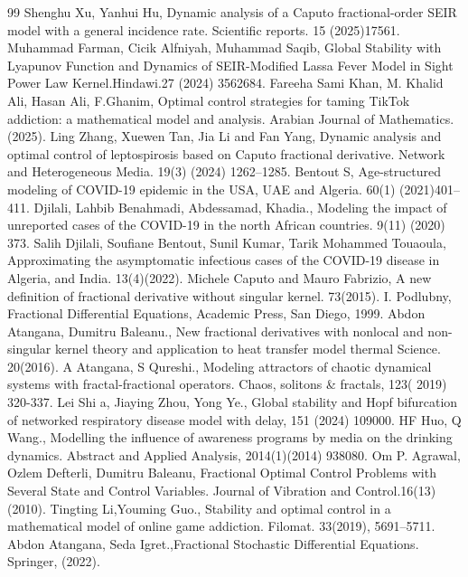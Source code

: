 \documentclass[10pt]{article}
\begin{document}
\begin{thebibliography}{99}
		 Shenghu Xu, Yanhui Hu, Dynamic analysis of a Caputo fractional-order SEIR model with a general incidence rate. Scientific reports. 15 (2025)17561.
		 Muhammad Farman, Cicik Alfniyah, Muhammad Saqib, Global Stability with Lyapunov Function and Dynamics of SEIR-Modified Lassa Fever Model in Sight Power Law Kernel.Hindawi.27 (2024) 3562684.
		 Fareeha Sami Khan, M. Khalid Ali, Hasan Ali, F.Ghanim, Optimal control strategies for taming TikTok addiction: a mathematical model and analysis. Arabian Journal of Mathematics. (2025).
		 Ling Zhang, Xuewen Tan, Jia Li and Fan Yang, Dynamic analysis and optimal control of leptospirosis based on Caputo fractional derivative. Network and Heterogeneous Media. 19(3) (2024) 1262–1285.
		 Bentout S, Age-structured modeling of COVID-19 epidemic in the USA, UAE and Algeria. 60(1) (2021)401–411.
		 Djilali, Lahbib Benahmadi, Abdessamad, Khadia., Modeling the impact of unreported cases of the COVID-19 in the north African countries. 9(11) (2020) 373.
		 Salih Djilali, Soufiane Bentout, Sunil Kumar, Tarik Mohammed Touaoula, Approximating the asymptomatic infectious cases of the COVID-19 disease in Algeria, and India. 13(4)(2022).
		 Michele Caputo and Mauro Fabrizio, A new definition of fractional derivative without singular kernel. 73(2015).
		 I. Podlubny, Fractional Differential Equations, Academic Press, San Diego, 1999.
		 Abdon Atangana, Dumitru Baleanu., New fractional derivatives with nonlocal and non-singular kernel theory and application to heat transfer model thermal Science. 20(2016).
		 A Atangana, S Qureshi., Modeling attractors of chaotic dynamical systems with fractal-fractional operators. Chaos, solitons \& fractals, 123( 2019) 320-337.
		 Lei Shi a, Jiaying Zhou, Yong Ye., Global stability and Hopf bifurcation of networked respiratory disease model with delay, 151 (2024) 109000.
		 HF Huo, Q Wang., Modelling the influence of awareness programs by media on the drinking dynamics. Abstract and Applied Analysis, 2014(1)(2014) 938080.
		 Om P. Agrawal, Ozlem Defterli, Dumitru Baleanu, Fractional Optimal Control Problems with Several State and Control Variables. Journal of Vibration and Control.16(13) (2010).
		 Tingting Li,Youming Guo., Stability and optimal control in a mathematical model of online game addiction. Filomat. 33(2019), 5691–5711.
		 Abdon Atangana, Seda Igret.,Fractional Stochastic Differential Equations. Springer, (2022).

\end{thebibliography}
\end{document}
